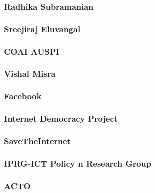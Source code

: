 \documentclass{article}
\begin{document}
\subsubsection{Radhika Subramanian}


\subsubsection{Sreejiraj Eluvangal}


\subsubsection{COAI AUSPI}


\subsubsection{Vishal Misra}


\subsubsection{Facebook}


\subsubsection{Internet Democracy Project}


\subsubsection{SaveTheInternet}


\subsubsection{IPRG-ICT Policy n Research Group}


\subsubsection{ACTO}

\end{document}
